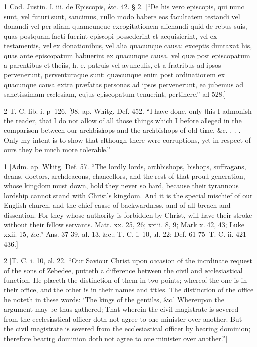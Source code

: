 1
Cod. Justin. I. iii. de Episcopis, &c. 42. § 2. [“De his vero episcopis, qui nunc sunt, vel futuri sunt, sancimus, nullo modo habere eos facultatem testandi vel donandi vel per aliam quamcunque excogitationem alienandi quid de rebus suis, quas postquam facti fuerint episcopi possederint et acquisierint, vel ex testamentis, vel ex donationibus, vel alia quacunque causa: exceptis duntaxat his, quas ante episcopatum habuerint ex quacunque causa, vel quæ post episcopatum a parentibus et theiis, h. e. patruis vel avunculis, et a fratribus ad ipsos pervenerunt, perventuraque sunt: quæcunque enim post ordinationem ex quacunque causa extra præfatas personas ad ipsos pervenerunt, ea jubemus ad sanctissimam ecclesiam, cujus episcopatum tenuerint, pertinere.” ad 528.]

2
T. C. lib. i. p. 126. [98, ap. Whitg. Def. 452. “I have done, only this I admonish the reader, that I do not allow of all those things which I before alleged in the comparison between our archbishops and the archbishops of old time, &c. . . . Only my intent is to show that although there were corruptions, yet in respect of ours they be much more tolerable.”]

1
[Adm. ap. Whitg. Def. 57. “The lordly lords, archbishops, bishops, suffragans, deans, doctors, archdeacons, chancellors, and the rest of that proud generation, whose kingdom must down, hold they never so hard, because their tyrannous lordship cannot stand with Christ’s kingdom. And it is the special mischief of our English church, and the chief cause of backwardness, and of all breach and dissention. For they whose authority is forbidden by Christ, will have their stroke without their fellow servants. Matt. xx. 25, 26; xxiii. 8, 9; Mark x. 42, 43; Luke xxii. 15, &c.” Ans. 37-39, al. 13, &c.; T. C. i. 10, al. 22; Def. 61-75; T. C. ii. 421-436.]

2
[T. C. i. 10, al. 22. “Our Saviour Christ upon occasion of the inordinate request of the sons of Zebedee, putteth a difference between the civil and ecclesiastical function. He placeth the distinction of them in two points; whereof the one is in their office, and the other is in their names and titles. The distinction of the office he noteth in these words: ‘The kings of the gentiles, &c.’ Whereupon the argument may be thus gathered; That wherein the civil magistrate is severed from the ecclesiastical officer doth not agree to one minister over another. But the civil magistrate is severed from the ecclesiastical officer by bearing dominion; therefore bearing dominion doth not agree to one minister over another.”]

